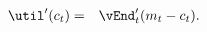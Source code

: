   \begin{eqnarray}
    \util^{\prime}({c}_{t})  & = & {\vEnd}_{t}^{\prime}({m}_{t}-{c}_{t}).
                                   \label{eq:upEqbetaOp}
  \end{eqnarray}
